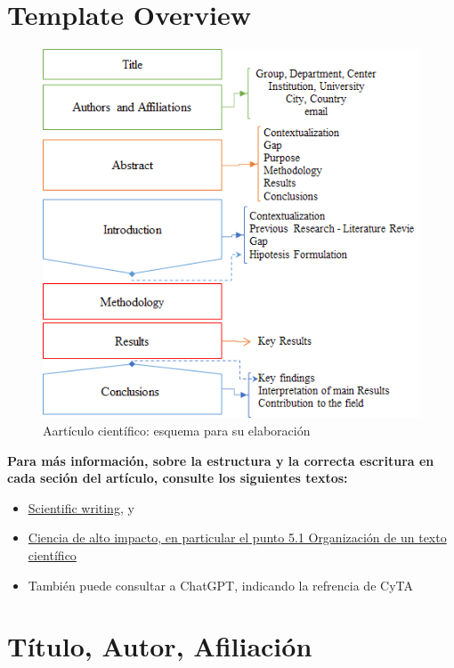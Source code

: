 \documentclass[a4paper,12pt]{article}
\begin{document}
\newpage
\section*{Template Overview}

\begin{figure}[h]
    \centering
    \includegraphics[width=0.9\linewidth]{Figures/article.png}
    \caption{Aartículo científico: esquema para su elaboración}

   \label{fig:article}
\end{figure}
\textbf{Para más información, sobre la estructura y la correcta escritura en cada seción  del artículo, consulte los siguientes textos: 
}
\begin{itemize}
    \item \href{https://www.cyta.com.ar/biblioteca/scientific_publications/scientific_writing.html}{Scientific writing},\parencite{scientific_writing} y 
    \item \href{https://www.cyta.com.ar/biblioteca/bddoc/bdlibros/ciencia_alto_impacto.htm#x5-1}{Ciencia de alto impacto, en particular el punto 5.1 Organización de un texto científico} \textcite{ciencia_alto_impacto}
   \item 
   También puede consultar a ChatGPT, indicando la refrencia de CyTA
\cite{chatgpt2025rdf}
\end{itemize}

\newpage
\section{Título, Autor, Afiliación}
\label{sec:Title,Creator}
\end{document}
